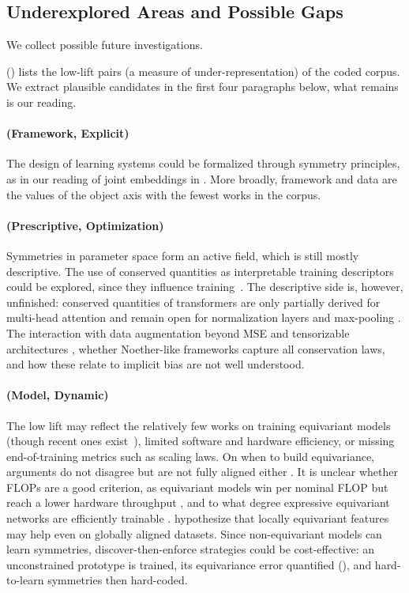 \documentclass[mathematics,review,submit,moreauthors]{Definitions/mdpi}
\begin{document}
\subsection{Underexplored Areas and Possible Gaps}
We collect possible future investigations.

 () lists the low-lift pairs (a measure of under-representation) of the coded corpus.
We extract plausible candidates in the first four paragraphs below, what remains is our reading.

\paragraph{(Framework, Explicit)}
The design of learning systems could be formalized through symmetry principles, as in our reading of joint embeddings in .
More broadly, framework and data are the values of the object axis with the fewest works in the corpus.

\paragraph{(Prescriptive, Optimization)}
Symmetries in parameter space form an active field, which is still mostly descriptive.
The use of conserved quantities as interpretable training descriptors could be explored, since they influence training~\citep{tarmoun2021p3icml}.
The descriptive side is, however, unfinished: conserved quantities of transformers are only partially derived for multi-head attention and remain open for normalization layers and max-pooling \citep{marcotte2025p4icml}.
The interaction with data augmentation beyond MSE and tensorizable architectures \citep{galley2026}, whether Noether-like frameworks capture all conservation laws, and how these relate to implicit bias \citep{zhao2025} are not well understood.

\paragraph{(Model, Dynamic)}
The low lift may reflect the relatively few works on training equivariant models (though recent ones exist~\citep{nordenfors2024,pertigkiozoglou2024,elhag2026}), limited software and hardware efficiency, or missing end-of-training metrics such as scaling laws.
On when to build equivariance, arguments do not disagree but are not fully aligned either \citep{lippmann2025iclr,brehmer2025,shen2026,vadgama2025,rygiel2026,vandegeijn2025}.
It is unclear whether FLOPs are a good criterion, as equivariant models win per nominal FLOP but reach a lower hardware throughput \citep{brehmer2025}, and to what degree expressive equivariant networks are efficiently trainable \citep{pacini2026,elbaz2025}.
\citet{lawrence2026} hypothesize that locally equivariant features may help even on globally aligned datasets.
Since non-equivariant models can learn symmetries, discover-then-enforce strategies \citep{escriche2025,otto2025} could be cost-effective: an unconstrained prototype is trained, its equivariance error quantified (), and hard-to-learn symmetries then hard-coded.
\end{document}
